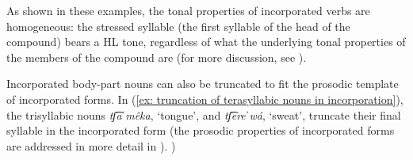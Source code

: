     \z
\z

As shown in these examples, the tonal properties of incorporated verbs are homogeneous: the stressed syllable (the first syllable of the head of the compound) bears a HL tone, regardless of what the underlying tonal properties of the members of the compound are (for more discussion, see ).

Incorporated body-part nouns can also be truncated to fit the prosodic template of incorporated forms. In (\ref{ex: truncation of terasyllabic nouns in incorporation}), the trisyllabic nouns \textit{tʃ͡aˈmêka}, ‘tongue’, and \textit{tʃ͡ereˈwá}, ‘sweat’, truncate their final syllable in the incorporated form (the prosod\-ic properties of incorporated forms are addressed in more detail in ).
)

